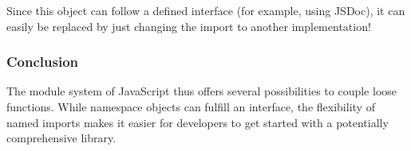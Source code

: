 Since this object can follow a defined interface (for example, using JSDoc), it
can easily be replaced by just changing the import to another implementation!

\subsubsection{Conclusion} %
\label{sec:Conclusion}
The module system of JavaScript thus offers several possibilities to couple
loose functions. While namespace objects can fulfill an interface, the
flexibility of named imports makes it easier for developers to get started with
a potentially comprehensive library.

